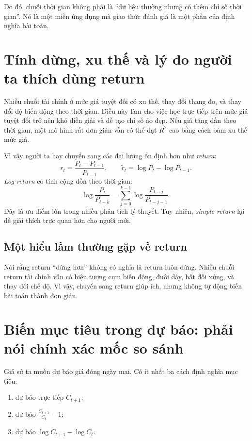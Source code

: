 Do đó, chuỗi thời gian không phải là ``dữ liệu thường nhưng có thêm chỉ số thời gian''. Nó là một miền ứng dụng mà giao thức đánh giá là một phần của định nghĩa bài toán.

\section{Tính dừng, xu thế và lý do người ta thích dùng return}

Nhiều chuỗi tài chính ở mức giá tuyệt đối có xu thế, thay đổi thang đo, và thay đổi độ biến động theo thời gian. Điều này làm cho việc học trực tiếp trên mức giá tuyệt đối trở nên khó diễn giải và dễ tạo chỉ số ảo đẹp. Nếu giá tăng dần theo thời gian, một mô hình rất đơn giản vẫn có thể đạt \(R^2\) cao bằng cách bám xu thế mức giá.

Vì vậy người ta hay chuyển sang các đại lượng ổn định hơn như \emph{return}:
\[
r_t=\frac{P_t-P_{t-1}}{P_{t-1}},
\qquad
\tilde{r}_t=\log P_t-\log P_{t-1}.
\]
\emph{Log-return} có tính cộng dồn theo thời gian:
\[
\log \frac{P_t}{P_{t-k}}
=
\sum_{j=0}^{k-1}\log \frac{P_{t-j}}{P_{t-j-1}}.
\]
Đây là ưu điểm lớn trong nhiều phân tích lý thuyết. Tuy nhiên, \emph{simple return} lại dễ giải thích trực quan hơn cho người mới.

\subsection{Một hiểu lầm thường gặp về return}

Nói rằng return ``dừng hơn'' không có nghĩa là return luôn dừng. Nhiều chuỗi return tài chính vẫn có hiện tượng cụm biến động, đuôi dày, bất đối xứng, và thay đổi chế độ. Vì vậy, chuyển sang return giúp ích, nhưng không tự động biến bài toán thành đơn giản.

\section{Biến mục tiêu trong dự báo: phải nói chính xác mốc so sánh}

Giả sử ta muốn dự báo giá đóng ngày mai. Có ít nhất ba cách định nghĩa mục tiêu:

\begin{enumerate}
\item dự báo trực tiếp \(C_{t+1}\);
\item dự báo \(\frac{C_{t+1}}{C_t}-1\);
\item dự báo \(\log C_{t+1}-\log C_t\).
\end{enumerate}

